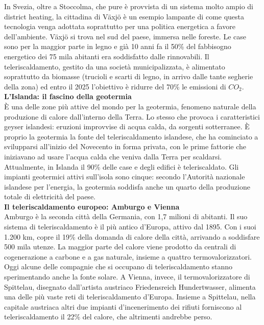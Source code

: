 \documentclass[laurea,oneside,11pt]{USiena_tesiLM}
\begin{document}
In Svezia, oltre a Stoccolma, che pure è provvista di un sistema molto ampio di district heating, la cittadina di Växjö è un esempio lampante di come questa tecnologia venga adottata soprattutto per una politica energetica a favore dell'ambiente. Växjö si trova nel sud del paese, immersa nelle foreste. Le case sono per la maggior parte in legno e già 10 anni fa il 50\% del fabbisogno energetico dei 75 mila abitanti era soddisfatto dalle rinnovabili. Il teleriscaldamento, gestito da una società municipalizzata, è alimentato soprattutto da biomasse (trucioli e scarti di legno, in arrivo dalle tante segherie della zona) ed entro il 2025 l'obiettivo è ridurre del 70\% le emissioni di $CO_2$.\\

\noindent\textbf{L’Islanda: il fascino della geotermia}\\
\noindent \`E una delle zone più attive del mondo per la geotermia, fenomeno naturale della produzione di calore dall'interno della Terra. Lo stesso che provoca i caratteristici geyser islandesi: eruzioni improvvise di acqua calda, da sorgenti sotterranee. \`E proprio la geotermia la fonte del teleriscaldamento islandese, che ha cominciato a svilupparsi all'inizio del Novecento in forma privata, con le prime fattorie che iniziavano ad usare l'acqua calda che veniva dalla Terra per scaldarsi. Attualmente, in Islanda il 90\% delle case e degli edifici è teleriscaldato. Gli impianti geotermici attivi sull'isola sono cinque: secondo l'Autorità nazionale islandese per l'energia, la geotermia soddisfa anche un quarto della produzione totale di elettricità del paese.\\

\noindent\textbf{Il teleriscaldamento europeo: Amburgo e Vienna}\\
\noindent Amburgo è la seconda città della Germania, con 1,7 milioni di abitanti. Il suo sistema di teleriscaldamento è il più antico d'Europa, attivo dal 1895. Con i suoi 1.200 km, copre il 19\% della domanda di calore della città, arrivando a soddisfare 500 mila utenze. La maggior parte del calore viene prodotto da centrali di cogenerazione a carbone e a gas naturale, insieme a quattro termovalorizzatori. Oggi alcune delle compagnie che si occupano di teleriscaldamento stanno sperimentando anche la fonte solare.
A Vienna, invece, il termovalorizzatore di Spittelau, disegnato dall’artista austriaco Friedensreich Hundertwasser, alimenta una delle più vaste reti di teleriscaldamento d'Europa. Insieme a Spittelau, nella capitale austriaca altri due impianti d'incenerimento dei rifiuti forniscono al teleriscaldamento il 22\% del calore, che altrimenti andrebbe perso.\\
\end{document}
